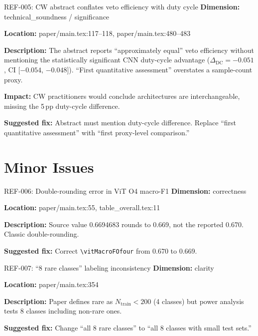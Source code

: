 \documentclass[11pt]{article}
\begin{document}
\begin{MajorIssueBox}{REF-005: CW abstract conflates veto efficiency with duty cycle}
\textbf{Dimension:} technical\_soundness / significance

\textbf{Location:} paper/main.tex:117--118, paper/main.tex:480--483

\textbf{Description:} The abstract reports ``approximately equal'' veto efficiency without mentioning the statistically significant CNN duty-cycle advantage ($\Delta_\mathrm{DC} = -0.051$, CI [$-0.054$, $-0.048$]). ``First quantitative assessment'' overstates a sample-count proxy.

\textbf{Impact:} CW practitioners would conclude architectures are interchangeable, missing the 5\,pp duty-cycle difference.

\textbf{Suggested fix:} Abstract must mention duty-cycle difference. Replace ``first quantitative assessment'' with ``first proxy-level comparison.''
\end{MajorIssueBox}


\section*{Minor Issues}

\begin{MinorIssueBox}{REF-006: Double-rounding error in ViT O4 macro-F1}
\textbf{Dimension:} correctness

\textbf{Location:} paper/main.tex:55, table\_overall.tex:11

\textbf{Description:} Source value 0.6694683 rounds to 0.669, not the reported 0.670. Classic double-rounding.

\textbf{Suggested fix:} Correct \texttt{\textbackslash vitMacroFOfour} from 0.670 to 0.669.
\end{MinorIssueBox}

\begin{MinorIssueBox}{REF-007: ``8 rare classes'' labeling inconsistency}
\textbf{Dimension:} clarity

\textbf{Location:} paper/main.tex:354

\textbf{Description:} Paper defines rare as $N_\mathrm{train} < 200$ (4 classes) but power analysis tests 8 classes including non-rare ones.

\textbf{Suggested fix:} Change ``all 8 rare classes'' to ``all 8 classes with small test sets.''
\end{MinorIssueBox}
\end{document}
